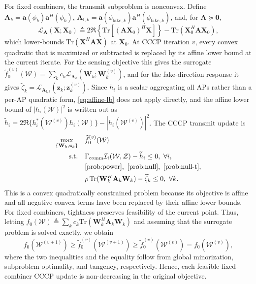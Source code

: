 \documentclass[letterpaper,journal]{IEEEtran}
\begin{document}
For fixed combiners, the transmit subproblem is nonconvex. Define $\mathbf{A}_k=\mathbf{a}(\phi_k)\mathbf{a}^H(\phi_k)$, $\mathbf{A}_{\mathrm{f},k}=\mathbf{a}(\phi_{\mathrm{fake},k})\mathbf{a}^H(\phi_{\mathrm{fake},k})$, and, for $\mathbf A\succeq\mathbf0$,
\begin{equation}
\mathcal{L}_{\mathbf A}(\mathbf X;\mathbf X_0)
\triangleq2\Re\!\left\{\mathrm{Tr}[(\mathbf A\mathbf X_0)^H\mathbf X]\right\}
-\mathrm{Tr}(\mathbf X_0^H\mathbf A\mathbf X_0),
\label{eq:affine-lb}
\end{equation}
which lower-bounds $\mathrm{Tr}(\mathbf X^H\mathbf A\mathbf X)$ at $\mathbf X_0$. At CCCP iteration $v$, every convex quadratic that is maximized or subtracted is replaced by its affine lower bound at the current iterate. For the sensing objective this gives the surrogate $\widetilde f_0^{(v)}(\mathcal W)={\textstyle\sum_k}c_k\mathcal{L}_{\mathbf A_k}(\mathbf W_k;\mathbf W_k^{(v)})$, and for the fake-direction response it gives $\widetilde\zeta_k=\mathcal{L}_{\mathbf A_{\mathrm{f},k}}(\mathbf z_k;\mathbf z_k^{(v)})$. Since $h_i$ is a scalar aggregating all APs rather than a per-AP quadratic form, \eqref{eq:affine-lb} does not apply directly, and the affine lower bound of $|h_i(\mathcal W)|^2$ is written out as $\widetilde h_i=2\Re\{h_i^*(\mathcal W^{(v)})h_i(\mathcal W)\}-|h_i(\mathcal W^{(v)})|^2$.
The CCCP transmit update \cite{scutari2017sca} is
\begin{subequations}\label{eq:tx-cvx}
\begin{align}
\max_{\{\mathbf{W}_k,\mathbf{z}_k\}}\quad & \widetilde f_0^{(v)}(\mathcal{W})\\
\text{s.t.}\quad & \Gamma_{\mathrm{comm}}\mathcal{I}_i(\mathcal{W},\mathcal{Z})-\widetilde h_i\le 0,\ \forall i,\\
& \eqref{prob:power},\ \eqref{prob:null},\ \eqref{prob:null-t},\\
& \rho\,\mathrm{Tr}(\mathbf{W}_k^H\mathbf{A}_k\mathbf{W}_k)-\widetilde\zeta_k\le 0,\ \forall k.
\end{align}
\end{subequations}
This is a convex quadratically constrained problem because its objective is affine and all negative convex terms have been replaced by their affine lower bounds. For fixed combiners, tightness preserves feasibility of the current point. Thus, letting $f_0(\mathcal W)\triangleq\sum_k c_k\mathrm{Tr}(\mathbf W_k^H\mathbf A_k\mathbf W_k)$ and assuming that the surrogate problem is solved exactly, we obtain
\begin{equation}
f_0(\mathcal W^{(v+1)})
\ge \widetilde f_0^{(v)}(\mathcal W^{(v+1)})
\ge \widetilde f_0^{(v)}(\mathcal W^{(v)})
=f_0(\mathcal W^{(v)}),
\label{eq:cccp-monotonicity}
\end{equation}
where the two inequalities and the equality follow from global minorization, subproblem optimality, and tangency, respectively. Hence, each feasible fixed-combiner CCCP update is non-decreasing in the original objective.
\end{document}
